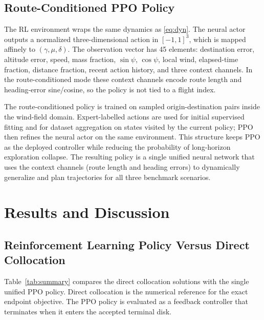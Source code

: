 \documentclass[11pt,a4paper]{article}
\begin{document}
\subsection{Route-Conditioned PPO Policy}
The RL environment wraps the same dynamics as \eqref{eq:dyn}. The neural
actor outputs a normalized three-dimensional action in $[-1,1]^3$, which
is mapped affinely to $(\gamma,\mu,\delta)$. The observation vector has
45 elements: destination error, altitude error, speed, mass fraction,
$\sin\psi$, $\cos\psi$, local wind, elapsed-time fraction, distance
fraction, recent action history, and three context channels. In the
route-conditioned mode these context channels encode route length and
heading-error sine/cosine, so the policy is not tied to a flight index.

The route-conditioned policy is trained on sampled origin-destination
pairs inside the wind-field domain. Expert-labelled actions are used for
initial supervised fitting and for dataset aggregation on states visited
by the current policy; PPO then refines the neural actor on the same
environment. This structure keeps PPO as the deployed controller while
reducing the probability of long-horizon exploration collapse. The
resulting policy is a single unified neural network that uses the context
channels (route length and heading errors) to dynamically generalize and
plan trajectories for all three benchmark scenarios.

\section{Results and Discussion}
\subsection{Reinforcement Learning Policy Versus Direct Collocation}
Table~\ref{tab:summary} compares the direct collocation solutions with
the single unified PPO policy. Direct collocation is the numerical
reference for the exact endpoint objective. The PPO policy is evaluated
as a feedback controller that terminates when it enters the accepted
terminal disk.
\end{document}
